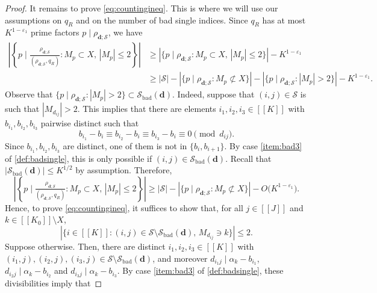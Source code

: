 \documentclass[11pt]{amsart}
\theoremstyle{definition}
\renewcommand{\leq}{\leqslant}
\renewcommand{\geq}{\geqslant}
\newcommand{\sinterval}[1]{[\![#1]\!] }
\newcommand{\abs}[1]{\left|#1\right|}
\newcommand{\eps}{\varepsilon}
\renewcommand{\d}{\boldsymbol{d}}
\newcommand{\pcomp}[2]{d_{#1#2}}
\newcommand{\cstH}{\eps_1}
\newcommand{\quantity}{\repK^{1-\cstH}}
\newcommand{\sommespart}{b}
\newcommand{\fprod}[1]{\rho_{#1}}
\newcommand{\s}{\mathcal{S}}
\newcommand{\modulus}{q}
\newcommand{\repK}{K}
\newcommand{\newK}{\sinterval{K}}
\newcommand{\newR}{\sinterval{J}}
\newcommand{\kbad}{\s_{\mathrm{bad}}(\d)}
\newcommand{\insingleproof}{M}
\newcommand{\xinsingleproof}{X}
\newcommand{\littleh}{k}
\begin{document}
\begin{proof}
It remains to prove \cref{eq:countingineq}. This is where we will use our assumptions on $\modulus_R$ and on the number of bad single indices. Since $\modulus_{R}$ has at most $\quantity$ prime factors $p\mid \fprod{\d; \s}$, we have 
\begin{align*}
\abs{ \left\{p \mid \tfrac{\fprod{\d; \s}}{(\fprod{\d; \s}, \modulus_R)} : \insingleproof_p \subset \xinsingleproof,\, |\insingleproof_p| \leq 2\right\} } &\geq  \abs{ \{p\mid \fprod{\d; \s} :  \insingleproof_p \subset \xinsingleproof,\, |\insingleproof_p| \leq 2\} } - \quantity\\
&\geq |\s| - \abs{ \{p\mid \fprod{\d; \s} :  \insingleproof_p \not\subset \xinsingleproof\} }  - \abs{ \{p\mid \fprod{\d; \s} :  |\insingleproof_p|>2\}} -\quantity.
\end{align*}
Observe that $\{p\mid \fprod{\d; \s} :  |\insingleproof_p|>2\}\subset \kbad$. Indeed, suppose that $(i,j)\in \s$ is such that $|\insingleproof_{\pcomp{i}{j}}|>2$. This implies that there are elements $i_1, i_2, i_3\in \newK$ with $\sommespart_{i_1}, \sommespart_{i_2}, \sommespart_{i_3}$ pairwise distinct such that 
\begin{equation*}
\sommespart_{i_1} - \sommespart_{i} \equiv \sommespart_{i_2} - \sommespart_{i} \equiv \sommespart_{i_3} - \sommespart_{i} \equiv 0 \pmod{\pcomp{i}{j}}.
\end{equation*}
Since $\sommespart_{i_1}, \sommespart_{i_2}, \sommespart_{i_3}$ are distinct, one of them is not in $\{\sommespart_i, \sommespart_{i+1}\}$. By case \cref{item:bad3} of \cref{def:badsingle}, this is only possible if $(i,j)\in \kbad$. Recall that $\abs{\kbad} \leq \repK^{1/2}$ by assumption. Therefore,
\begin{equation*}
\abs{ \left\{p \mid \tfrac{\fprod{\d; \s}}{(\fprod{\d; \s}, \modulus_R)} : \insingleproof_p \subset \xinsingleproof,\, |\insingleproof_p| \leq 2\right\} }  \geq |\s| -  \abs{ \{p\mid \fprod{\d; \s} :  \insingleproof_p \not\subset \xinsingleproof\} }  -O\big(\quantity\big).
\end{equation*}
Hence, to prove \cref{eq:countingineq}, it suffices to show that, for all $j\in \newR$ and $\littleh \in \sinterval{K_0} \setminus \xinsingleproof$,
\begin{equation*}
\abs{\{ i\in \newK : (i,j)\in \s\setminus \kbad,\, \insingleproof_{\pcomp{i}{j}}\ni \littleh\} } \leq 2.
\end{equation*}
Suppose otherwise. Then, there are distinct $i_1, i_2, i_3\in \newK$ with ${(i_1,j), (i_2,j), (i_3,j)\in \s\setminus \kbad}$, and moreover $\pcomp{i_1}{j} \mid \alpha_{\littleh} - \sommespart_{i_1}$, $\pcomp{i_2}{j} \mid \alpha_{\littleh} - \sommespart_{i_2}$ and $\pcomp{i_3}{j} \mid \alpha_{\littleh} - \sommespart_{i_3}$. By case \cref{item:bad3} of \cref{def:badsingle}, these divisibilities imply that 

\end{proof}
\end{document}

